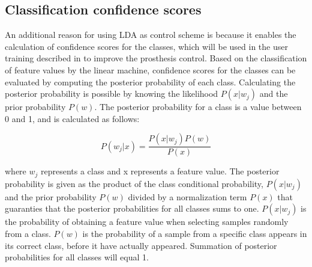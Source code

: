 \subsection{Classification confidence scores}
An additional reason for using LDA as control scheme is because it enables the calculation of confidence scores for the classes, which will be used in the user training described in   to improve the prosthesis control. Based on the classification of feature values by the linear machine, confidence scores for the classes can be evaluated by computing the posterior probability of each class. Calculating the posterior probability is possible by knowing the likelihood $P(x|w_j)$ and the prior probability $P(w)$.
The posterior probability for a class is a value between 0 and 1, and is calculated as follows:

\begin{equation}
P(w_j|x) = \frac{P(x|w_j)P(w)}{P(x)}
\end{equation}

where $w_j$ represents a class and x represents a feature value. The posterior probability is given as the product of the class conditional probability, $P(x|w_j)$ and the prior probability $P(w)$ divided by a normalization term $P(x)$ that guaranties that the posterior probabilities for all classes sums to one. $P(x|w_j)$ is the probability of obtaining a feature value when selecting samples randomly from a class. $P(w)$ is the probability of a sample from a specific class appears in its correct class, before it have actually appeared. Summation of posterior probabilities for all classes will equal 1.

